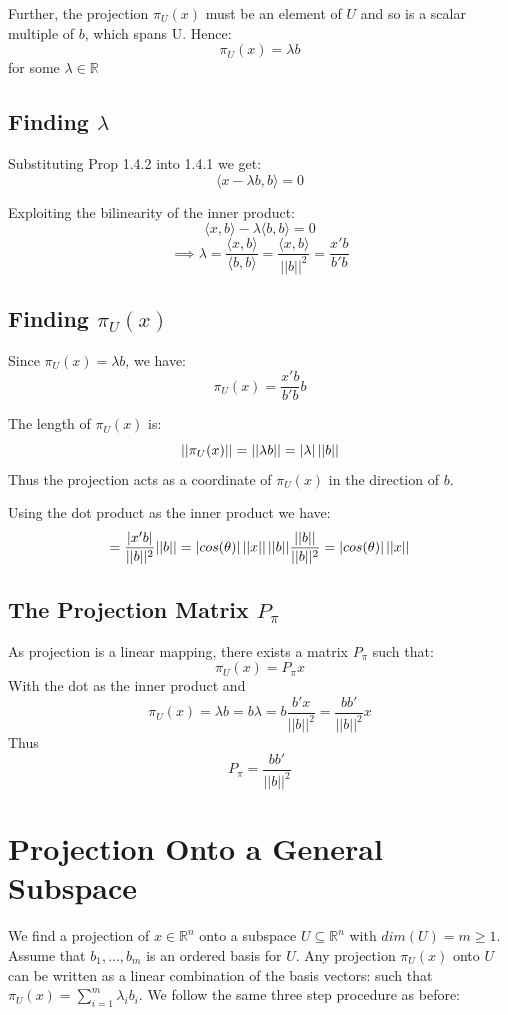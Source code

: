 \documentclass[DIV=14,titlepage=false]{scrreprt}
\begin{document}
\begin{prop}
  Further, the projection \(\pi_U(x)\) must be an element of \(U\) and so is a scalar multiple of \(b\), which spans U. Hence: \[\pi_U(x)=\lambda b\] for some \(\lambda \in \mathbb{R}\)
\end{prop}

\subsection{Finding \(\lambda\)}

Substituting Prop 1.4.2 into 1.4.1 we get:
\[\langle x-\lambda b,b \rangle = 0\]

Exploiting the bilinearity of the inner product:
\[\langle x,b \rangle - \lambda \langle b,b \rangle = 0\]
\[\implies \lambda = \frac{\langle x,b \rangle}{\langle b,b \rangle} = \frac{\langle x,b \rangle}{ ||b||^2} = \frac{x'b}{b'b}\]

\subsection{Finding \(\pi_U(x)\)}

Since \(\pi_U(x)=\lambda b\), we have:
\[\pi_U(x)=\frac{x'b}{b'b}b\]

The length of \(\pi_U(x)\) is: \[||\pi_U(x)||=||\lambda b||=|\lambda| \hspace{0.5mm} ||b||\] Thus the projection acts as a coordinate of \(\pi_U(x)\) in the direction of \(b\).

Using the dot product as the inner product we have:
\[=\frac{|x'b|}{||b||^2}||b||=|cos(\theta)|\hspace{0.5mm}||x||\hspace{0.5mm}||b||\frac{||b||}{||b||^2}=|cos(\theta)|\hspace{0.5mm}||x||\]

\subsection{The Projection Matrix \(P_\pi\)}
As projection is a linear mapping, there exists a matrix \(P_\pi\) such that: \[\pi_U(x)=P_\pi x\]
With the dot as the inner product and \[\pi_U(x)=\lambda b = b\lambda = b\frac{b'x}{||b||^2}=\frac{bb'}{||b||^2}x\]
Thus \[P_\pi=\frac{bb'}{||b||^2}\]

\section{Projection Onto a General Subspace}
We find a projection of \(x \in \mathbb{R}^n\) onto a subspace \(U \subseteq \mathbb{R}^n\) with \(dim(U)=m\geq1\).
Assume that \(b_1,...,b_m\) is an ordered basis for \(U\). Any projection \(\pi_U(x)\) onto \(U\) can be written as a linear combination of the basis vectors: such that \(\pi_U(x)=\sum_{i=1}^{m}\lambda_i b_i\).
We follow the same three step procedure as before:
\end{document}

